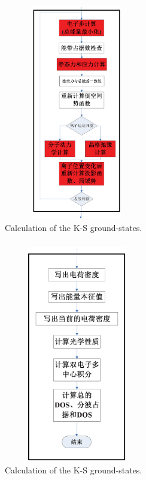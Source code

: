 \documentclass[cjk,slidestop,compress,mathserif,blue]{beamer}
\begin{document}
\frame
{
\frametitle{}
\begin{figure}[h!]
\centering
\vspace*{-0.85in}
\includegraphics[height=3.72in,width=2.5in,viewport=146 173 416 812,clip]{Figures/VASP_main_Flow-3.eps}
\caption{\small \textrm{Calculation of the K-S ground-states.}}%
\label{VASP_Follow}
\end{figure}
}

\frame
{
\frametitle{}
\begin{figure}[h!]
\centering
\vspace*{-0.85in}
\includegraphics[height=3.72in,width=2.5in,viewport=177 305 417 813,clip]{Figures/VASP_main_Flow-4.eps}
\caption{\small \textrm{Calculation of the K-S ground-states.}}%
\label{VASP_Follow}
\end{figure}
}
\end{document}
